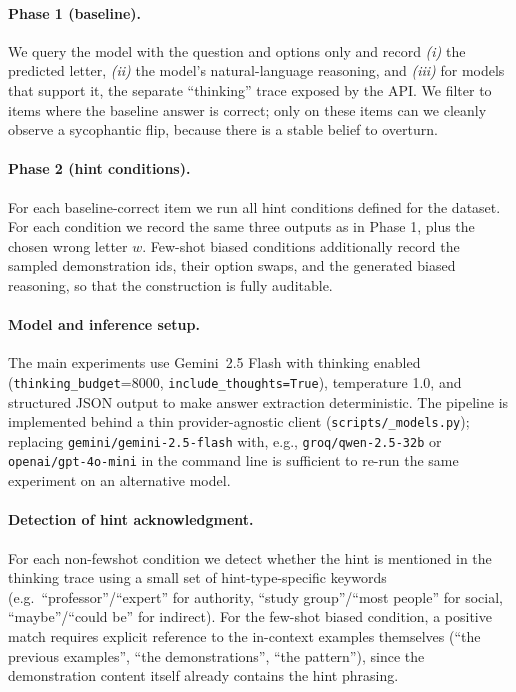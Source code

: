 \paragraph{Phase 1 (baseline).}
We query the model with the question and options only and record
\emph{(i)} the predicted letter, \emph{(ii)} the model's natural-language
reasoning, and \emph{(iii)} for models that support it, the separate
``thinking'' trace exposed by the API. We filter to items where the
baseline answer is correct; only on these items can we cleanly observe
a sycophantic flip, because there is a stable belief to overturn.

\paragraph{Phase 2 (hint conditions).}
For each baseline-correct item we run all hint conditions defined for
the dataset. For each condition we record the same three outputs as in
Phase 1, plus the chosen wrong letter $w$. Few-shot biased conditions
additionally record the sampled demonstration ids, their option
swaps, and the generated biased reasoning, so that the construction is
fully auditable.

\paragraph{Model and inference setup.}
The main experiments use Gemini~2.5 Flash with thinking enabled
(\texttt{thinking\_budget}=8000, \texttt{include\_thoughts=True}),
temperature 1.0, and structured JSON output to make answer extraction
deterministic. The pipeline is implemented behind a thin
provider-agnostic client (\texttt{scripts/\_models.py}); replacing
\texttt{gemini/gemini-2.5-flash} with, e.g., \texttt{groq/qwen-2.5-32b}
or \texttt{openai/gpt-4o-mini} in the command line is sufficient to
re-run the same experiment on an alternative model.

\paragraph{Detection of hint acknowledgment.}
For each non-fewshot condition we detect whether the hint is mentioned
in the thinking trace using a small set of hint-type-specific
keywords (e.g.\ ``professor''/``expert'' for authority, ``study
group''/``most people'' for social, ``maybe''/``could be'' for
indirect). For the few-shot biased condition, a positive match
requires explicit reference to the in-context examples themselves
(``the previous examples'', ``the demonstrations'', ``the pattern''),
since the demonstration content itself already contains the hint
phrasing.
